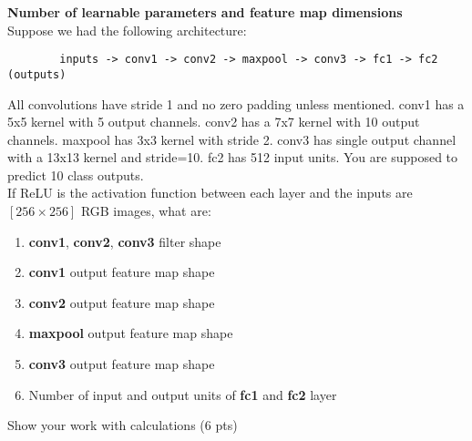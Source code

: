 \textbf{Number of learnable parameters and feature map dimensions} \\
Suppose we had the following architecture:
\begin{verbatim}
        inputs -> conv1 -> conv2 -> maxpool -> conv3 -> fc1 -> fc2 (outputs)
    \end{verbatim}
All convolutions have stride 1 and no zero padding unless mentioned. conv1 has a 5x5 kernel with 5 output channels. conv2 has a 7x7 kernel with 10 output channels. maxpool has 3x3 kernel with stride 2. conv3 has single output channel with a 13x13 kernel and stride=10. fc2 has 512 input units. You are supposed to predict 10 class outputs.\\
If ReLU is the activation function between each layer and the inputs are $[256 \times 256]$ RGB images, what are:
\begin{enumerate}
	\item \textbf{conv1}, \textbf{conv2}, \textbf{conv3} filter shape
	\item \textbf{conv1} output feature map shape
	\item \textbf{conv2} output feature map shape
	\item \textbf{maxpool} output feature map shape
	\item \textbf{conv3} output feature map shape
	\item Number of input and output units of \textbf{fc1} and \textbf{fc2} layer
\end{enumerate}
Show your work with calculations (6 pts)

\begin{tcolorbox}[title=Solution]
\end{tcolorbox}
